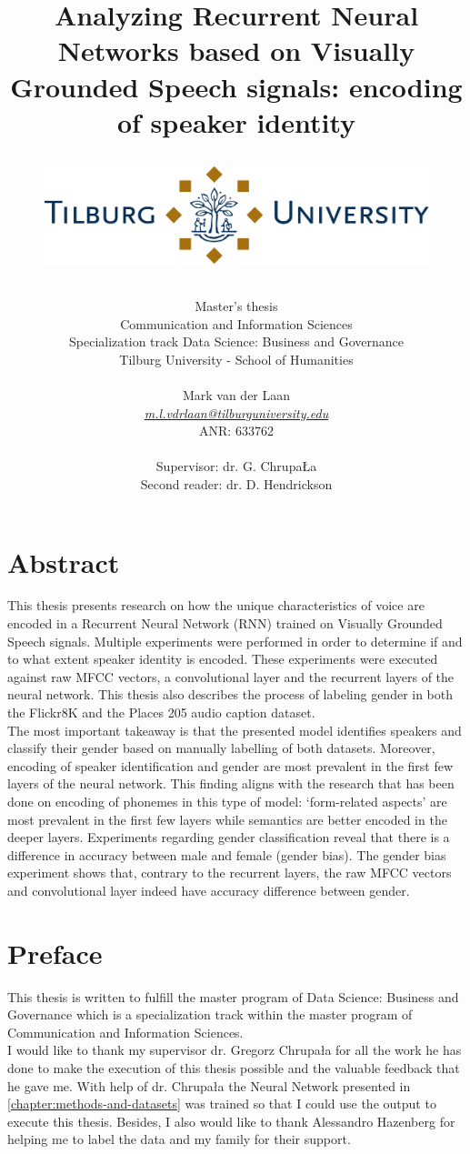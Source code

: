 \documentclass[a4paper, oneside]{book}
\title{
    {\textbf{Analyzing Recurrent Neural Networks based on Visually Grounded Speech signals: encoding of speaker identity}}\\
    \vspace{2cm}
	{
	\begin{figure}[h]
	\centering
	\includegraphics[scale=0.15]{images/Tilburg_University_logo.png}\\
	\end{figure}
	}
}
\author{
Master's thesis \\
Communication and Information Sciences \\
Specialization track Data Science: Business and Governance \\
Tilburg University - School of Humanities \\\vspace{1cm}\\
Mark van der Laan \\ 
\textit{\href{mailto:m.l.vdrlaan@tilburguniversity.edu}{m.l.vdrlaan@tilburguniversity.edu}} \\ ANR: 633762 \\\vspace{1cm}\\ 
Supervisor: dr. G. ChrupaŁa \\ 
Second reader: dr. D. Hendrickson}
\begin{document}
\maketitle
\chapter*{Abstract}

This thesis presents research on how the unique characteristics of voice are encoded in a Recurrent Neural Network (RNN) trained on Visually Grounded Speech signals. Multiple experiments were performed in order to determine if and to what extent speaker identity is encoded. These experiments were executed against raw MFCC vectors, a convolutional layer and the recurrent layers of the neural network. This thesis also describes the process of labeling gender in both the Flickr8K and the Places 205 audio caption dataset. \\

The most important takeaway is that the presented model identifies speakers and classify their gender based on manually labelling of both datasets. Moreover, encoding of speaker identification and gender are most prevalent in the first few layers of the neural network. This finding aligns with the research that has been done on encoding of phonemes in this type of model: ‘form-related aspects’ are most prevalent in the first few layers while semantics are better encoded in the deeper layers. Experiments regarding gender classification reveal that there is a difference in accuracy between male and female (gender bias). The gender bias experiment shows that, contrary to the recurrent layers, the raw MFCC vectors and convolutional layer indeed have accuracy difference between gender. 

\chapter*{Preface}

This thesis is written to fulfill the master program of Data Science: Business and Governance which is a specialization track within the master program of Communication and Information Sciences. \\

I would like to thank my supervisor dr. Gregorz Chrupa\l a for all the work he has done to make the execution of this thesis possible and the valuable feedback that he gave me. With help of dr. Chrupa\l a the Neural Network presented in \autoref{chapter:methods-and-datasets} was trained so that I could use the output to execute this thesis. Besides, I also would like to thank Alessandro Hazenberg for helping me to label the data and my family for their support. \\
\end{document}
